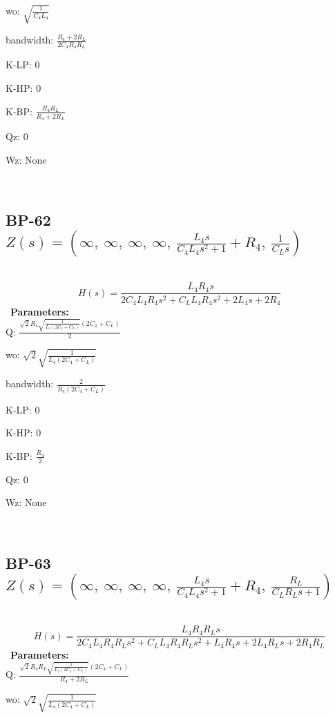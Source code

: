 \documentclass{article}
\begin{document}
wo: $\sqrt{\frac{1}{C_{4} L_{4}}}$\ 

bandwidth: $\frac{R_{4} + 2 R_{L}}{2 C_{4} R_{4} R_{L}}$\ 

K-LP: $0$\ 

K-HP: $0$\ 

K-BP: $\frac{R_{4} R_{L}}{R_{4} + 2 R_{L}}$\ 

Qz: $0$\ 

Wz: $\text{None}$\ 

\ 

\subsection{BP-62 $Z(s) = \left( \infty, \  \infty, \  \infty, \  \infty, \  \frac{L_{4} s}{C_{4} L_{4} s^{2} + 1} + R_{4}, \  \frac{1}{C_{L} s}\right)$ } \ 
\textbf{\[H(s) = \frac{L_{4} R_{4} s}{2 C_{4} L_{4} R_{4} s^{2} + C_{L} L_{4} R_{4} s^{2} + 2 L_{4} s + 2 R_{4}}\] } \ 
\textbf{Parameters:}\\ 

Q: $\frac{\sqrt{2} R_{4} \sqrt{\frac{1}{L_{4} \left(2 C_{4} + C_{L}\right)}} \left(2 C_{4} + C_{L}\right)}{2}$\ 

wo: $\sqrt{2} \sqrt{\frac{1}{L_{4} \left(2 C_{4} + C_{L}\right)}}$\ 

bandwidth: $\frac{2}{R_{4} \left(2 C_{4} + C_{L}\right)}$\ 

K-LP: $0$\ 

K-HP: $0$\ 

K-BP: $\frac{R_{4}}{2}$\ 

Qz: $0$\ 

Wz: $\text{None}$\ 

\ 

\subsection{BP-63 $Z(s) = \left( \infty, \  \infty, \  \infty, \  \infty, \  \frac{L_{4} s}{C_{4} L_{4} s^{2} + 1} + R_{4}, \  \frac{R_{L}}{C_{L} R_{L} s + 1}\right)$ } \ 
\textbf{\[H(s) = \frac{L_{4} R_{4} R_{L} s}{2 C_{4} L_{4} R_{4} R_{L} s^{2} + C_{L} L_{4} R_{4} R_{L} s^{2} + L_{4} R_{4} s + 2 L_{4} R_{L} s + 2 R_{4} R_{L}}\] } \ 
\textbf{Parameters:}\\ 

Q: $\frac{\sqrt{2} R_{4} R_{L} \sqrt{\frac{1}{L_{4} \left(2 C_{4} + C_{L}\right)}} \left(2 C_{4} + C_{L}\right)}{R_{4} + 2 R_{L}}$\ 

wo: $\sqrt{2} \sqrt{\frac{1}{L_{4} \left(2 C_{4} + C_{L}\right)}}$\ 
\end{document}
